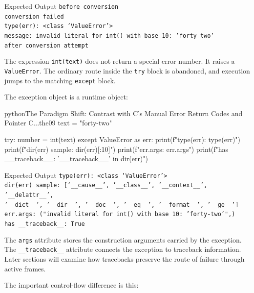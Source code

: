 \documentclass[a4paper,twoside]{report}
\begin{document}
\begin{iobox}{Expected Output}
\texttt{before conversion} \\
\texttt{conversion failed} \\
\texttt{type(err): <class 'ValueError'>} \\
\texttt{message: invalid literal for int() with base 10: 'forty-two'} \\
\texttt{after conversion attempt} \\
\end{iobox}


The expression \texttt{int(text)} does not return a special error number. It raises a \texttt{ValueError}. The ordinary route inside the \texttt{try} block is abandoned, and execution jumps to the matching \texttt{except} block.

The exception object is a runtime object:

\begin{codebox}[]{python}{The Paradigm Shift: Contrast with C's Manual Error Return Codes and Pointer C...}{the09}
text = "forty-two"

try:
    number = int(text)
except ValueError as err:
    print(f"type(err): {type(err)}")
    print(f"dir(err) sample: {dir(err)[:10]}")
    print(f"err.args: {err.args}")
    print(f"has __traceback__: {'__traceback__' in dir(err)}")
\end{codebox}


\begin{iobox}{Expected Output}
\texttt{type(err): <class 'ValueError'>} \\
\texttt{dir(err) sample: ['\_\_cause\_\_', '\_\_class\_\_', '\_\_context\_\_', '\_\_delattr\_\_',} \\
\texttt{'\_\_dict\_\_', '\_\_dir\_\_', '\_\_doc\_\_', '\_\_eq\_\_', '\_\_format\_\_', '\_\_ge\_\_']} \\
\texttt{err.args: ("invalid literal for int() with base 10: 'forty-two'",)} \\
\texttt{has \_\_traceback\_\_: True} \\
\end{iobox}


The \texttt{args} attribute stores the construction arguments carried by the exception. The \texttt{\_\_traceback\_\_} attribute connects the exception to traceback information. Later sections will examine how tracebacks preserve the route of failure through active frames.

The important control-flow difference is this:
\end{document}
